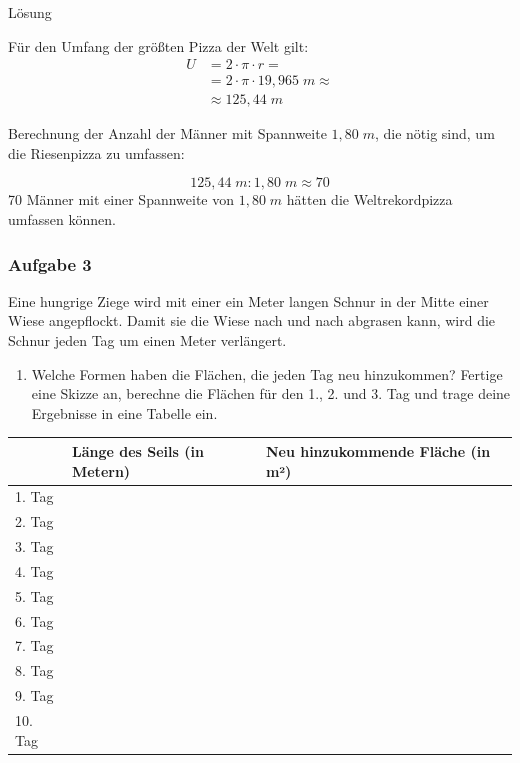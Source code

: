 \documentclass[
  ngerman,
]{book}
\providecommand{\tightlist}{%
  \setlength{\itemsep}{0pt}\setlength{\parskip}{0pt}}
\begin{document}
Lösung

Für den Umfang der größten Pizza der Welt gilt:
\[ \begin{align} U &= 2 \cdot \pi \cdot r =\\
                   &= 2 \cdot \pi \cdot 19,965\; m \approx \\
                   & \approx 125,44\;m \end{align}\]

Berechnung der Anzahl der Männer mit Spannweite \(1,80\;m\), die nötig sind, um die Riesenpizza zu umfassen:

\[125,44\;m : 1,80\;m \approx 70\]
70 Männer mit einer Spannweite von \(1,80\;m\) hätten die Weltrekordpizza umfassen können.

\hypertarget{section-50}{%
\subsubsection*{}\label{section-50}}

\hypertarget{aufgabe-3-7}{%
\subsubsection*{Aufgabe 3}\label{aufgabe-3-7}}

Eine hungrige Ziege wird mit einer ein Meter langen Schnur in der Mitte einer Wiese angepflockt. Damit sie die Wiese nach und nach abgrasen kann, wird die Schnur jeden Tag um einen Meter verlängert.

\begin{enumerate}
\def\labelenumi{\alph{enumi})}
\tightlist
\item
  Welche Formen haben die Flächen, die jeden Tag neu hinzukommen? Fertige eine Skizze an, berechne die Flächen für den 1., 2. und 3. Tag und trage deine Ergebnisse in eine Tabelle ein.
\end{enumerate}

\begin{longtable}[]{@{}lll@{}}
\toprule
& Länge des Seils (in Metern) & Neu hinzukommende Fläche (in m²)\tabularnewline
\midrule
\endhead
1. Tag & &\tabularnewline
2. Tag & &\tabularnewline
3. Tag & &\tabularnewline
4. Tag & &\tabularnewline
5. Tag & &\tabularnewline
6. Tag & &\tabularnewline
7. Tag & &\tabularnewline
8. Tag & &\tabularnewline
9. Tag & &\tabularnewline
10. Tag & &\tabularnewline
\bottomrule
\end{longtable}
\end{document}
